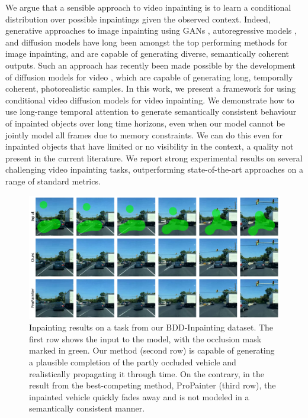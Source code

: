  
We argue that a sensible approach to video inpainting is to learn a conditional distribution over possible inpaintings given the observed context. Indeed, generative approaches to image inpainting using GANs \citep{imin3, imin4, imin5}, autoregressive models \citep{imin1}, and diffusion models \citep{palette, repaint} have long been amongst the top performing methods for image inpainting, and are capable of generating diverse, semantically coherent outputs. Such an approach has recently been made possible by the development of diffusion models for video \citep{didrik, fdm, vdm, yang2022diffusion, voleti2022MCVD}, which are capable of generating long, temporally coherent, photorealistic samples. In this work, we present a framework for using conditional video diffusion models for video inpainting. We demonstrate how to use long-range temporal attention to generate semantically consistent behaviour of inpainted objects over long time horizons, even when our model cannot be jointly model all frames due to memory constraints. We can do this even for inpainted objects that have limited or no visibility in the context, a quality not present in the current literature. We report strong experimental results on several challenging video inpainting tasks, outperforming state-of-the-art approaches on a range of standard metrics.

\begin{figure}[h!]
    \centering
    \includegraphics[width=\textwidth]{figures/bddv2.pdf}
    \caption{Inpainting results on a task from our BDD-Inpainting dataset. The first row shows the input to the model, with the occlusion mask marked in green. Our method (second row) is capable of generating a plausible completion of the partly occluded vehicle and realistically propagating it through time. On the contrary, in the result from the best-competing method, ProPainter \citep{propainter} (third row), the inpainted vehicle quickly fades away and is not modeled in a semantically consistent manner.}
    \label{fig:fig1}
\end{figure}

